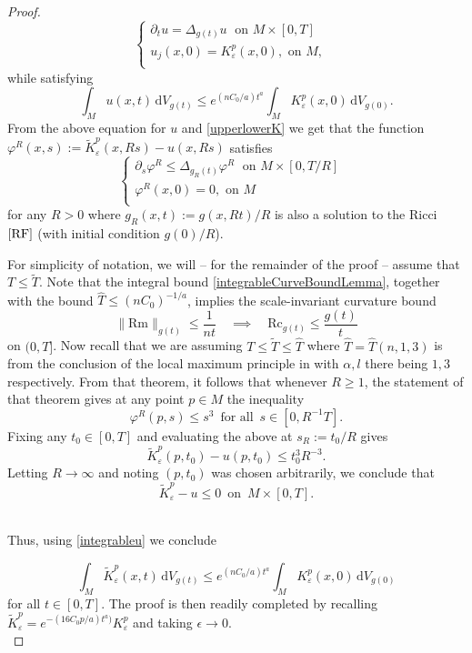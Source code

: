 \documentclass[10pt,a4paper]{amsart}
\newcommand{\Rc}{\mathrm{Rc}}
\newcommand{\Rm}{\mathrm{Rm}}
\newcommand{\dV}{\mathrm{d}V}
\begin{document}
\begin{proof}
\[
\begin{cases}
\partial_t u= \Delta_{g(t)} u\; \text{ on }M\times[0, T] & \\
u_{j}(x,0) = K_{\varepsilon}^p(x,0), \text{ on }M,& \\
\end{cases}
\]
while satisfying
\begin{equation}\label{integrableu}
\int_{M} u(x, t) \,\dV_{g(t)} \le e^{(nC_0/a)t^{a}}\int_{M} K_{\varepsilon}^p(x,0)  \,\dV_{g(0)} .
\end{equation}
From the above equation for $u$ and \eqref{upperlowerK} we get that the function $\varphi^R(x,s):=\widetilde K_{\varepsilon}^p(x,Rs)-u(x,Rs)$ satisfies
\begin{equation}\label{heatphiR}
\begin{cases}
\partial_s \varphi^R\leq \Delta_{g_R(t)} \varphi^R \; \text{ on }M\times[0, T/R] & \\
\varphi^R(x, 0)=0, \text{ on }M& \\
\end{cases}
\end{equation}
for any $R>0$ where $g_R(x, t):=g(x, Rt)/R$ is also a solution to the Ricci $\eqref{RF}$ (with initial condition $g(0)/R$).
\,

For simplicity of notation, we will – for the remainder of the proof – assume that $T\leq \widetilde T$. Note that the integral bound \eqref{integrableCurveBoundLemma}, together with the bound $\widehat T\leq (nC_0)^{-1/a}$, implies the scale-invariant curvature bound
\[
\|\Rm\|_{g(t)}\leq \frac{1}{nt} \quad \implies \quad \Rc_{g(t)}\leq \frac{g(t)}{t}
\]
on $(0,T]$.  Now recall that we are assuming $T\leq \widetilde{T}\leq \widehat T$ where $\widehat T = \widehat T(n, 1, 3)$ is from the conclusion of the local maximum principle in {\cite[Theorem 1.1]{LeeTam}} with $\alpha, l$ there being $1,3$ respectively.  From that theorem, it follows that whenever $R\geq 1$, the statement of that theorem gives at any point $p\in M$ the inequality
\[
\varphi^R(p,s)\leq s^3 \,\,\, \text{for all} \,\,\, s \in [0, R^{-1}T].
\]
Fixing any $t_0\in [0, T]$ and evaluating the above at $s_R:=t_0/R$ gives 
\[
\widetilde K_{\varepsilon}^p(p,t_0)-u(p,t_0)\leq t_0^3 R^{-3}. 
\]
Letting $R\to \infty$ and noting $(p, t_0)$ was chosen arbitrarily, we conclude that
\begin{equation}\label{upperboundu}\widetilde K_{\varepsilon}^p-u\leq 0 \,\,\, \text{on} \,\,\, M\times[0, T].
\end{equation}
\,

Thus, using \eqref{integrableu} we conclude 

\[\int_{M} \widetilde K_{\varepsilon}^p(x, t) \,\dV_{g(t)} \le e^{(nC_0/a)t^{a}}\int_{M} K_{\varepsilon}^p(x,0)  \,\dV_{g(0)} \]
for all $t\in [0, T]$. The proof is then readily completed by recalling $\widetilde K_{\varepsilon}^p = e^{-(16C_0 p/a)t^a)}K_{\varepsilon}^p$ and  taking $\epsilon\to 0$. \\
\end{proof}
\end{document}
